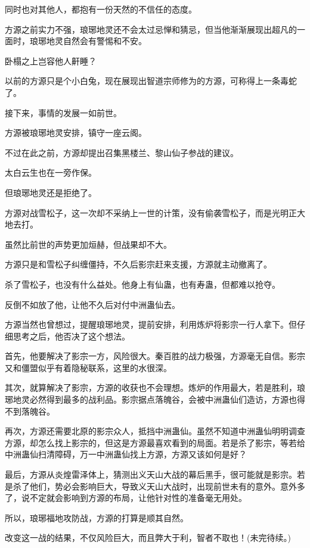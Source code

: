 \begin{this_body}
同时也对其他人，都抱有一份天然的不信任的态度。

方源之前实力不强，琅琊地灵还不会太过忌惮和猜忌，但当他渐渐展现出超凡的一面时，琅琊地灵自然会有警惕和不安。

卧榻之上岂容他人鼾睡？

以前的方源只是个小白兔，现在展现出智道宗师修为的方源，可称得上一条毒蛇了。

接下来，事情的发展一如前世。

方源被琅琊地灵安排，镇守一座云阁。

不过在此之前，方源却提出召集黑楼兰、黎山仙子参战的建议。

太白云生也在一旁作保。

但琅琊地灵还是拒绝了。

方源对战雪松子，这一次却不采纳上一世的计策，没有偷袭雪松子，而是光明正大地去打。

虽然比前世的声势更加烜赫，但战果却不大。

方源只是和雪松子纠缠僵持，不久后影宗赶来支援，方源就主动撤离了。

杀了雪松子，也没有什么益处。他身上有仙蛊，也有寿蛊，但都难以抢夺。

反倒不如放了他，让他不久后对付中洲蛊仙去。

方源当然也曾想过，提醒琅琊地灵，提前安排，利用炼炉将影宗一行人拿下。但仔细思考之后，他否决了这个想法。

首先，他要解决了影宗一方，风险很大。秦百胜的战力极强，方源毫无自信。影宗又和僵盟似乎有着隐秘联系，这里的水很深。

其次，就算解决了影宗，方源的收获也不会理想。炼炉的作用最大，若是胜利，琅琊地灵必然得到最多的战利品。影宗据点落魄谷，会被中洲蛊仙们造访，方源也得不到落魄谷。

再次，方源还需要北原的影宗众人，抵挡中洲蛊仙。虽然不知道中洲蛊仙明明调查方源，却怎么找上影宗的，但这是方源最喜欢看到的局面。若是杀了影宗，等若给中洲蛊仙扫清障碍，万一中洲蛊仙找上方源，方源又该如何是好？

最后，方源从炎煌雷泽体上，猜测出义天山大战的幕后黑手，很可能就是影宗。若是杀了他们，势必会影响巨大，导致义天山大战时，出现前世未有的意外。意外多了，说不定就会影响到方源的布局，让他针对性的准备毫无用处。

所以，琅琊福地攻防战，方源的打算是顺其自然。

改变这一战的结果，不仅风险巨大，而且弊大于利，智者不取也！(未完待续。)

\end{this_body}

